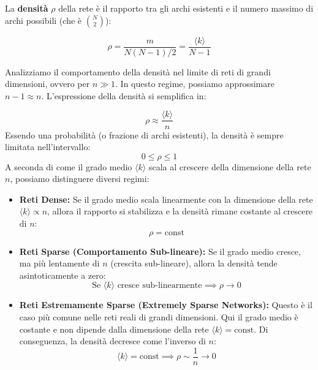 \noindent La \textbf{densità} $\rho$ della rete è il rapporto tra gli archi esistenti e il numero massimo di archi possibili (che è $\binom{N}{2}$):
\begin{tcolorbox}[colback=yellow!25, colframe=yellow!75!orange, coltitle=black, title=\textbf{Densità}]
\begin{equation}
\rho = \frac{m}{N(N-1)/2} = \frac{\langle k \rangle}{N-1}
\end{equation}
\end{tcolorbox}

Analizziamo il comportamento della densità nel limite di reti di grandi dimensioni, ovvero per $n \gg 1$.
In questo regime, possiamo approssimare $n-1 \approx n$. L'espressione della densità si semplifica in:

\begin{equation}
\rho \approx \frac{\langle k \rangle}{n}
\end{equation}
Essendo una probabilità (o frazione di archi esistenti), la densità è sempre limitata nell'intervallo:
\begin{equation}
0 \le \rho \le 1
\end{equation}
A seconda di come il grado medio $\langle k \rangle$ scala al crescere della dimensione della rete $n$, possiamo distinguere diversi regimi:

\begin{itemize}
    \item \textbf{Reti Dense:} Se il grado medio scala linearmente con la dimensione della rete $\langle k \rangle \propto n$, allora il rapporto si stabilizza e la densità rimane costante al crescere di $n$:
    \begin{equation}
    \rho = \text{const}
    \end{equation}

    \item \textbf{Reti Sparse (Comportamento Sub-lineare):} Se il grado medio cresce, ma più lentamente di $n$ (crescita sub-lineare), allora la densità tende asintoticamente a zero:
    \begin{equation}
    \text{Se } \langle k \rangle \text{ cresce sub-linearmente} \implies \rho \to 0
    \end{equation}

    \item \textbf{Reti Estremamente Sparse (Extremely Sparse Networks):} Questo è il caso più comune nelle reti reali di grandi dimensioni. Qui il grado medio è costante e non dipende dalla dimensione della rete $\langle k \rangle = \text{const}$. Di conseguenza, la densità decresce come l'inverso di $n$:
    \begin{equation}
    \langle k \rangle = \text{const} \implies \rho \sim \frac{1}{n} \to 0
    \end{equation}
\end{itemize}


